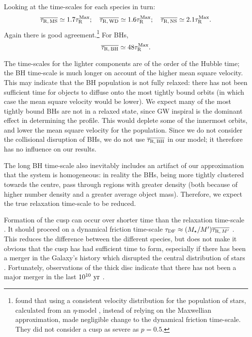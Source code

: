 Looking at the time-scales for each species in turn:
\begin{equation}
\overline{\tau_\mathrm{R,\,MS}} \simeq 1.7 \tau_\mathrm{R}^\mathrm{Max};\quad \overline{\tau_\mathrm{R,\,WD}} \simeq 1.6 \tau_\mathrm{R}^\mathrm{Max};\quad \overline{\tau_\mathrm{R,\,NS}} \simeq 2.1 \tau_\mathrm{R}^\mathrm{Max}.
\end{equation}
Again there is good agreement.\footnote{\citet*{Freitag2006} found that using a consistent velocity distribution for the population of stars, calculated from an $\eta$-model \citep{Tremaine1994}, instead of relying on the Maxwellian approximation, made negligible change to the dynamical friction time-scale. They did not consider a cusp as severe as $p = 0.5$.} For BHs,
\begin{equation}
\overline{\tau_\mathrm{R,\,BH}} \simeq 48 \tau_\mathrm{R}^\mathrm{Max}.
\end{equation}

The time-scales for the lighter components are of the order of the Hubble time; the BH time-scale is much longer on account of the higher mean square velocity. This may indicate that the BH population is not fully relaxed: there has not been sufficient time for objects to diffuse onto the most tightly bound orbits (in which case the mean square velocity would be lower). We expect many of the most tightly bound BHs are not in a relaxed state, since GW inspiral is the dominant effect in determining the profile. This would deplete some of the innermost orbits, and lower the mean square velocity for the population. Since we do not consider the collisional disruption of BHs, we do not use $\overline{\tau_\mathrm{R,\,BH}}$ in our model; it therefore has no influence on our results.

The long BH time-scale also inevitably includes an artifact of our approximation that the system is homogeneous: in reality the BHs, being more tightly clustered towards the centre, pass through regions with greater density (both because of higher number density and a greater average object mass). Therefore, we expect the true relaxation time-scale to be reduced. 

Formation of the cusp can occur over shorter time than the relaxation time-scale \citep{Bar-Or2012}. It should proceed on a dynamical friction time-scale $\tau_\mathrm{DF} \approx (M_\star/M')\overline{\tau_{\mathrm{R},\,M'}}$ \citep[section 3.4]{Spitzer1987}. This reduces the difference between the different species, but does not make it obvious that the cusp has had sufficient time to form, especially if there has been a merger in the Galaxy's history which disrupted the central distribution of stars \citep{Gualandris2012}. Fortunately, observations of the thick disc indicate that there has not been a major merger in the last $10^{10}~\mathrm{yr}$ \citep{Wyse2008}.

